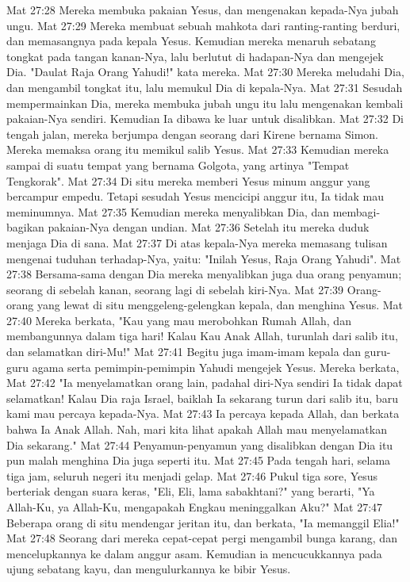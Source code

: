 Mat 27:28  Mereka membuka pakaian Yesus, dan mengenakan kepada-Nya jubah ungu.
Mat 27:29  Mereka membuat sebuah mahkota dari ranting-ranting berduri, dan memasangnya pada kepala Yesus. Kemudian mereka menaruh sebatang tongkat pada tangan kanan-Nya, lalu berlutut di hadapan-Nya dan mengejek Dia. "Daulat Raja Orang Yahudi!" kata mereka.
Mat 27:30  Mereka meludahi Dia, dan mengambil tongkat itu, lalu memukul Dia di kepala-Nya.
Mat 27:31  Sesudah mempermainkan Dia, mereka membuka jubah ungu itu lalu mengenakan kembali pakaian-Nya sendiri. Kemudian Ia dibawa ke luar untuk disalibkan.
Mat 27:32  Di tengah jalan, mereka berjumpa dengan seorang dari Kirene bernama Simon. Mereka memaksa orang itu memikul salib Yesus.
Mat 27:33  Kemudian mereka sampai di suatu tempat yang bernama Golgota, yang artinya "Tempat Tengkorak".
Mat 27:34  Di situ mereka memberi Yesus minum anggur yang bercampur empedu. Tetapi sesudah Yesus mencicipi anggur itu, Ia tidak mau meminumnya.
Mat 27:35  Kemudian mereka menyalibkan Dia, dan membagi-bagikan pakaian-Nya dengan undian.
Mat 27:36  Setelah itu mereka duduk menjaga Dia di sana.
Mat 27:37  Di atas kepala-Nya mereka memasang tulisan mengenai tuduhan terhadap-Nya, yaitu: "Inilah Yesus, Raja Orang Yahudi".
Mat 27:38  Bersama-sama dengan Dia mereka menyalibkan juga dua orang penyamun; seorang di sebelah kanan, seorang lagi di sebelah kiri-Nya.
Mat 27:39  Orang-orang yang lewat di situ menggeleng-gelengkan kepala, dan menghina Yesus.
Mat 27:40  Mereka berkata, "Kau yang mau merobohkan Rumah Allah, dan membangunnya dalam tiga hari! Kalau Kau Anak Allah, turunlah dari salib itu, dan selamatkan diri-Mu!"
Mat 27:41  Begitu juga imam-imam kepala dan guru-guru agama serta pemimpin-pemimpin Yahudi mengejek Yesus. Mereka berkata,
Mat 27:42  "Ia menyelamatkan orang lain, padahal diri-Nya sendiri Ia tidak dapat selamatkan! Kalau Dia raja Israel, baiklah Ia sekarang turun dari salib itu, baru kami mau percaya kepada-Nya.
Mat 27:43  Ia percaya kepada Allah, dan berkata bahwa Ia Anak Allah. Nah, mari kita lihat apakah Allah mau menyelamatkan Dia sekarang."
Mat 27:44  Penyamun-penyamun yang disalibkan dengan Dia itu pun malah menghina Dia juga seperti itu.
Mat 27:45  Pada tengah hari, selama tiga jam, seluruh negeri itu menjadi gelap.
Mat 27:46  Pukul tiga sore, Yesus berteriak dengan suara keras, "Eli, Eli, lama sabakhtani?" yang berarti, "Ya Allah-Ku, ya Allah-Ku, mengapakah Engkau meninggalkan Aku?"
Mat 27:47  Beberapa orang di situ mendengar jeritan itu, dan berkata, "Ia memanggil Elia!"
Mat 27:48  Seorang dari mereka cepat-cepat pergi mengambil bunga karang, dan mencelupkannya ke dalam anggur asam. Kemudian ia mencucukkannya pada ujung sebatang kayu, dan mengulurkannya ke bibir Yesus.

